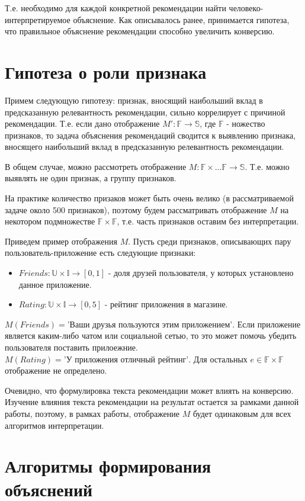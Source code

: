 \documentclass[12pt,a4paper]{report}
\begin{document}
Т.е. необходимо для каждой конкретной рекомендации найти человеко-интерпретируемое объяснение. Как описывалось ранее, принимается гипотеза, что правильное объяснение рекомендации способно увеличить конверсию.
\section{Гипотеза о роли признака}
Примем следующую гипотезу: признак, вносящий наибольший вклад в предсказанную релевантность рекомендации, сильно коррелирует с причиной рекомендации.
Т.е. если дано отображение $M': \mathbb{F} \to \mathbb{S}$, где $\mathbb{F}$ - ножество признаков, то задача объяснения рекомендаций сводится к выявлению признака, вносящего наибольший вклад в предсказанную релевантность рекомендации.

В общем случае, можно рассмотреть отображение $M: \mathbb{F} \times \dots \mathbb{F} \to \mathbb{S}$. Т.е. можно выявлять не один признак, а группу признаков.

На практике количество призаков может быть очень велико (в рассматриваемой задаче около 500 признаков), поэтому будем рассматривать отображение $M$ на некотором подмножестве $\mathbb{F} \times \mathbb{F}$, т.е. часть признаков оставим без интерпретации.

Приведем пример отображения $M$. Пусть среди признаков, описывающих пару пользователь-приложение есть следующие признаки:
\begin{itemize}
\item $Friends: \mathbb{U} \times \mathbb{I} \to [0, 1]$ - доля друзей пользователя, у которых установлено данное приложение.
\item $Rating: \mathbb{U} \times \mathbb{I} \to [0, 5]$ - рейтинг приложения в магазине.
\end{itemize}
$M(Friends) = \textit{'Ваши друзья пользуются этим приложением'}$. Если приложение является каким-либо чатом или социальной сетью, то это может помочь убедить пользователя поставить прилоежние.
$M(Rating) = \textit{'У приложения отличный рейтинг'}$.
Для остальных $e \in \mathbb{F} \times \mathbb{F}$ отображение не определено.

Очевидно, что формулировка текста рекомендации может влиять на конверсию. Изучение влияния текста рекомендации на результат остается за рамками данной работы, поэтому, в рамках работы, отображение $M$ будет одинаковым для всех алгоритмов интерпретации.
\section{Алгоритмы формирования объяснений}
\end{document}
